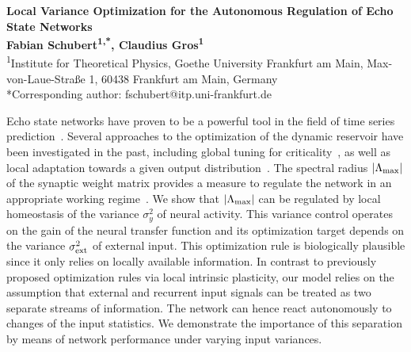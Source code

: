 \documentclass[a4paper,fontsize=12pt]{scrartcl}
\begin{document}
\pagestyle{empty}
\begin{spacing}{1.11}
\begin{center}
  \changefontsizes{20pt}\textbf{Local Variance Optimization for the Autonomous Regulation of Echo State Networks} \\
  \vspace{.74cm}
  \changefontsizes{12pt}\textbf{Fabian Schubert\textsuperscript{1,*}, Claudius Gros\textsuperscript{1}} \\
  \vspace{.44cm}
  \changefontsizes{10pt}\textsuperscript{1}Institute for Theoretical Physics, Goethe University Frankfurt am Main, Max-von-Laue-Straße 1, 60438 Frankfurt am Main, Germany \\
  *Corresponding author: fschubert@itp.uni-frankfurt.de
\end{center}
\vspace{-.08cm}

Echo state networks have proven to be a powerful tool in the field of time series prediction~\cite{Jaeger_2001,Lukosevicius_2009}. Several approaches to the optimization of the dynamic reservoir have been investigated in the past, including global tuning for criticality~\cite{Livi_2016}, as well as local adaptation towards a given output distribution~\cite{Schrauwen_2008,Boedecker_2009}. The spectral radius $|\Lambda_{\rm max}|$ of the synaptic weight matrix provides a measure to regulate the network in an appropriate working regime~\cite{Caluwaerts_2013}. We show that $|\Lambda_{\rm max}|$ can be regulated by local homeostasis of the variance $\sigma_y^2$ of neural activity. This variance control operates on the gain of the neural transfer function and its optimization target depends on the variance $\sigma_{\rm ext}^2$ of external input. This optimization rule is biologically plausible since it only relies on locally available information. In contrast to previously proposed optimization rules via local intrinsic plasticity, our model relies on the assumption that external and recurrent input signals can be treated as two separate streams of information. The network can hence react autonomously to changes of the input statistics. We demonstrate the importance of this separation by means of network performance under varying input variances.

\end{spacing}
\vspace{-.35cm}

\end{document}
